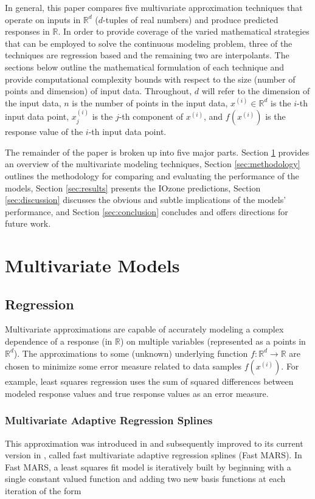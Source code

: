 \documentclass{scspaperproc}
\theoremstyle{scsthe}
\begin{document}
In general, this paper compares five multivariate approximation
techniques that operate on inputs in $\mathbb{R}^d$ ($d$-tuples of
real numbers) and produce predicted responses in $\mathbb{R}$. In
order to provide coverage of the varied mathematical strategies that
can be employed to solve the continuous modeling problem, three of the
techniques are regression based and the remaining two are
interpolants. The sections below outline the mathematical formulation
of each technique and provide computational complexity bounds with
respect to the size (number of points and dimension) of input
data. Throughout, $d$ will refer to the dimension of the input data,
$n$ is the number of points in the input data, $x^{(i)} \in
\mathbb{R}^d$ is the $i$-th input data point, $x^{(i)}_j$ is the
$j$-th component of $x^{(i)}$, and $f(x^{(i)})$ is the response value
of the $i$-th input data point.

The remainder of the paper is broken up into five major parts. Section
\ref{sec:multivariate} provides an overview of the multivariate
modeling techniques, Section \ref{sec:methodology} outlines the
methodology for comparing and evaluating the performance of the
models, Section \ref{sec:results} presents the IOzone predictions,
Section \ref{sec:discussion} discusses the obvious and subtle
implications of the models' performance, and Section
\ref{sec:conclusion} concludes and offers directions for future work.

\section{Multivariate Models}
\label{sec:multivariate}

\subsection{Regression}
\vspace{-10pt}
Multivariate approximations are capable of accurately modeling a
complex dependence of a response (in $\mathbb{R}$) on multiple
variables (represented as a points in $\mathbb{R}^{d}$). The
approximations to some (unknown) underlying function $f: \mathbb{R}^d
\rightarrow \mathbb{R}$ are chosen to minimize some error measure
related to data samples $f(x^{(i)})$. For example, least squares
regression uses the sum of squared differences between modeled
response values and true response values as an error measure.

\vspace{-10pt}
\subsubsection{Multivariate Adaptive Regression Splines}
\vspace{-10pt}
This approximation was introduced in
 and subsequently improved to its
current version in , called fast
multivariate adaptive regression splines (Fast MARS). In Fast MARS, a
least squares fit model is iteratively built by beginning with a
single constant valued function and adding two new basis functions at
each iteration of the form
\end{document}
